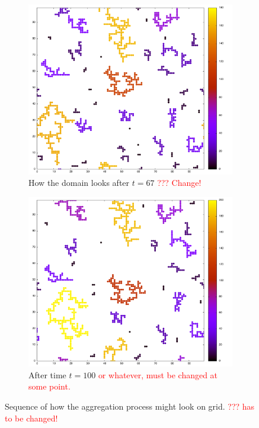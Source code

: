 \begin{figure}[h]
\begin{center}
\begin{subfigure}[t]{0.45\textwidth}
			\label{fig:33}
		\end{subfigure}
		\begin{subfigure}[t]{0.45\textwidth}
		\includegraphics[width = \textwidth]{fig/0067_on.png}
			\caption{How the domain looks after $ t = 67 $ \textcolor{red}{??? Change!}}
			\label{fig:67}
		\end{subfigure}
		\begin{subfigure}[t]{0.45\textwidth}
			\includegraphics[width = \textwidth]{fig/0099_on.png}
			\caption{After time $t = 100$ \textcolor{red}{or whatever, must be changed at some point.}}
			\label{fig:100}
		\end{subfigure}
		\caption{Sequence of how the aggregation process might look on grid. \textcolor{red}{??? has to be changed!}}
		\label{fig:arrays}
	\end{center}
\end{figure}


